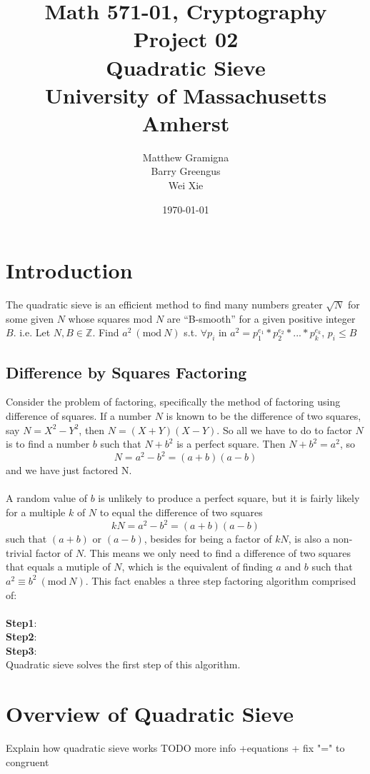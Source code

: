 \documentclass[titlepage]{article}
\title{Math 571-01, Cryptography Project 02 \\ Quadratic Sieve \\ University of Massachusetts Amherst}
\author{Matthew Gramigna \\ Barry Greengus \\  Wei Xie}
\date{\today}
\newcommand{\Mod}[1]{\ (\text{mod}\ #1)}
\begin{document}
	
	\maketitle
	
	\section{Introduction}
	The quadratic sieve is an efficient method to find many numbers greater $\sqrt{N}$ for some given $N$ whose squares mod $N$ are ``B-smooth'' for a given positive integer $B$. i.e. Let $N,B\in{\mathbb{Z}}$. Find $a^2 \Mod{N}$ s.t. $\forall p_i $ in $a^2 = p^{e_1}_1*p^{e_2}_2*...*p^{e_k}_k$, $p_i \leq B$\\
	
	\subsection{Difference by Squares Factoring}
	Consider the problem of factoring, specifically the method of factoring using difference of squares. If a number $N$ is known to be the difference of two squares, say $N = X^2 - Y^2$, then $N = (X+Y) (X-Y)$. So all we have to do to factor $N$ is to find a number $b$ such that $N + b^2$ is a perfect square. Then $N + b^2 = a^2$, so \[N = a^2 - b^2 = (a+b)(a-b)\] and we have just factored N.\\
	\\
	
	A random value of $b$ is unlikely to produce a perfect square, but it is fairly likely for a multiple $k$ of $N$ to equal the difference of two squares \[kN = a^2 - b^2 = (a+b)(a-b)\] such that $(a+b)$ or $(a-b)$, besides for being a factor of $kN$, is also a non-trivial factor of $N$. This means we only need to find a difference of two squares that equals a mutiple of $N$, which is the equivalent of finding $a$ and $b$ such that $a^2\equiv b^2 \Mod{N}$. This fact enables a three step factoring algorithm comprised of:\\\\
	\textbf{Step1}:\\
	\textbf{Step2}: \\
	\textbf{Step3}: \\
	
	Quadratic sieve solves the first step of this algorithm.

	\section{Overview of Quadratic Sieve}
	Explain how quadratic sieve works TODO more info +equations + fix "=" to congruent
\end{document}
